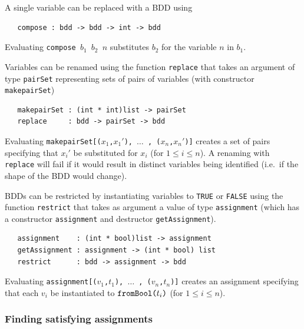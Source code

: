 \documentclass[12pt,fleqn]{book}
\renewcommand{\t}[1]{\mbox{\tt #1}}
\begin{document}
A single variable can be replaced with a BDD using

\begin{verbatim}
   compose : bdd -> bdd -> int -> bdd
\end{verbatim}

Evaluating \t{compose~$b_1$~$b_2$~$n$} substitutes $b_2$ for the
variable $n$ in $b_1$.

Variables can be renamed using the function \t{replace} that takes
an argument of type \t{pairSet} representing sets of pairs of variables
(with constructor \t{makepairSet})

\begin{verbatim}
   makepairSet : (int * int)list -> pairSet
   replace     : bdd -> pairSet -> bdd
\end{verbatim}

Evaluating \t{makepairSet[($x_1$,$x_1'$), $\ldots$ , ($x_n$,$x_n'$)]}
creates a set of pairs specifying that $x_i'$ be substituted for $x_i$
(for $1\leq i\leq n$).  A renaming with \t{replace} will fail if it
would result in distinct variables being identified (i.e.~if the shape of the BDD would change).

BDDs can be restricted by instantiating variables to {\t{TRUE}} or
{\t{FALSE}} using the function \t{restrict} that takes
as argument a value of type \t{assignment}
(which has a constructor \t{assignment} and destructor \t{getAssignment}).

\begin{verbatim}
   assignment    : (int * bool)list -> assignment
   getAssignment : assignment -> (int * bool) list
   restrict      : bdd -> assignment -> bdd
\end{verbatim}

\noindent Evaluating \t{assignment[($v_1$,$t_1$), $\ldots$ , ($v_n$,$t_n$)]}
creates an assignment specifying that each $v_i$ be instantiated to
$\t{fromBool(}t_i\t{)}$ (for $1{\leq}i{\leq}n$). 


\subsubsection{Finding satisfying assignments}
\end{document}
